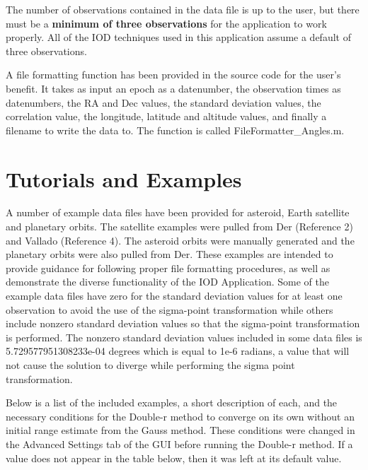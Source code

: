 \documentclass{article}
\begin{document}
				The number of observations contained in the data file is up to the user, but there must be a \textbf{minimum of three observations} for the application to work properly.
				All of the IOD techniques used in this application assume a default of three observations. \par

				A file formatting function has been provided in the source code for the user's benefit. It takes as input an epoch as a datenumber, the observation times as datenumbers, the RA and Dec values, the 		                             
				standard deviation values, the correlation value, the longitude, latitude and altitude values, and
				finally a filename to write the data to. The function is called FileFormatter\_Angles.m.

	\section{Tutorials and Examples}
		\hspace{0.45 cm}  A number of example data files have been provided for asteroid, Earth satellite and planetary orbits. The satellite examples were pulled from Der (Reference 2) and Vallado (Reference 4). The asteroid orbits were 
		manually generated and the planetary orbits were also pulled from Der. These examples are intended to provide guidance for following proper file formatting procedures, as well as demonstrate the diverse functionality of the IOD Application. 
		Some of the example data files have zero for the standard deviation values for at least one observation to avoid the use of the sigma-point transformation while others include nonzero standard deviation values so that the sigma-point transformation is performed.
		The nonzero standard deviation values included in some data files is 5.729577951308233e-04 degrees which is equal to 1e-6 radians, a value that will not cause the solution to diverge while performing the sigma point transformation. \par

		Below is a list of the included examples, a short description of each, and the necessary conditions for the Double-r method to converge on its own without an initial range estimate from the Gauss method. 
		These conditions were changed in the Advanced Settings tab of the GUI before running the Double-r method. If a value does not appear in the table below, then it was left at its default value.
\end{document}
